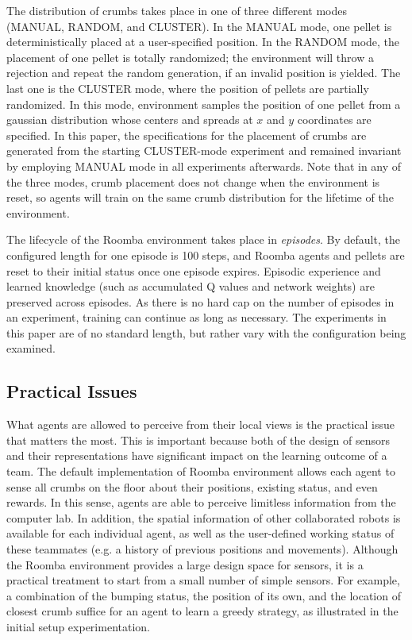 \documentclass[conference]{IEEEtran}
\begin{document}
The distribution of crumbs takes place in one of three different modes (MANUAL, RANDOM, and CLUSTER).
In the MANUAL mode, one pellet is deterministically placed at a user-specified
position. 
In the RANDOM mode, the placement of one pellet is totally randomized; the
environment will throw a rejection and repeat the random generation, if an
invalid position is yielded. The last one is the CLUSTER mode, where the
position of pellets are partially randomized. In this mode,
environment samples the position of one pellet from a gaussian distribution
whose centers and spreads at $x$ and $y$ coordinates are specified. 
In this paper, the specifications for the placement of crumbs are generated
from the starting CLUSTER-mode experiment and remained invariant by
employing MANUAL mode in all experiments afterwards.
Note that in any of the three modes, crumb placement does not change when the environment is reset, so agents will train on the same crumb distribution for the lifetime of the environment.

The lifecycle of the Roomba environment takes place in \textit{episodes}. 
By default, the configured length for one episode is 100 steps, and
Roomba agents and pellets are
reset to their initial status once one episode expires. 
Episodic experience and learned knowledge
(such as accumulated Q values and network weights) are preserved across episodes.  
As there is no hard cap on the number of episodes in an experiment, training can continue as long as necessary. The experiments in this paper are of no standard length, but rather vary with the configuration being examined.



\subsection{Practical Issues}
What agents are allowed to perceive from their local views is the practical
issue that matters the most. 
This is important because both of the design of sensors and their
representations have significant impact on the learning outcome of a team. 
The default implementation of Roomba environment allows each agent to sense
all crumbs on the floor about their positions, existing status, and even rewards. 
In this sense, agents are able to perceive limitless information from the
computer lab. 
In addition, the spatial information of other collaborated robots
is available for each individual agent, as well as the user-defined working
status of these teammates (e.g. a history of previous positions and
movements).  Although the Roomba environment provides a large design space for
sensors, it is a practical treatment to start from a small number of simple
sensors. For example, a combination of the bumping status, the position of its
own, and the location of closest crumb suffice for an agent to learn a greedy
strategy, as illustrated in the initial setup experimentation.  
\end{document}
